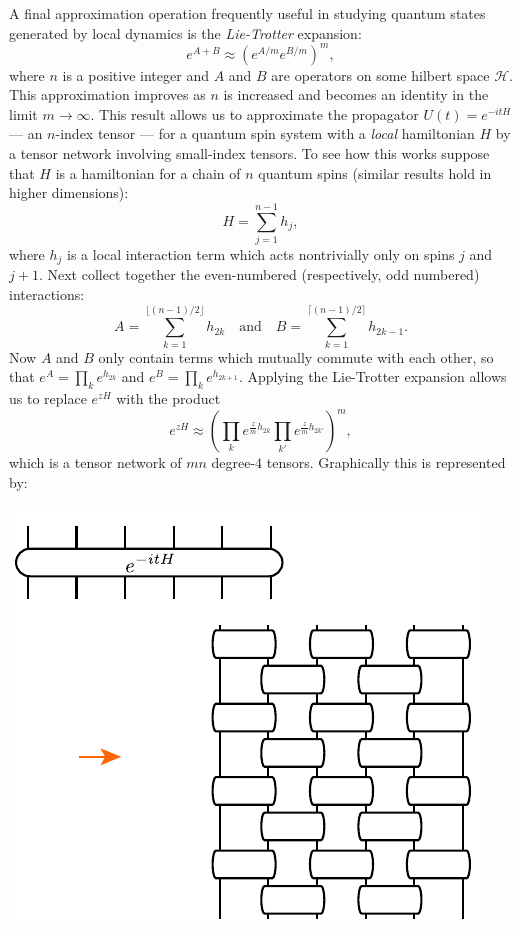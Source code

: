 \documentclass[prl,twocolumn,lengthcheck,superscriptaddress]{revtex4-1}
\theoremstyle{definition}
\theoremstyle{remark}
\begin{document}
A final approximation operation frequently useful in studying quantum states generated by local dynamics is the \emph{Lie-Trotter} expansion:
\begin{equation}
	e^{A+B} \approx (e^{A/m}e^{B/m})^m,
\end{equation}
where $n$ is a positive integer and $A$ and $B$ are operators on some hilbert space $\mathcal{H}$. This approximation improves as $n$ is increased and becomes an identity in the limit $m\rightarrow \infty$. This result allows us to approximate the propagator $U(t) = e^{-itH}$ --- an $n$-index tensor --- for a quantum spin system with a \emph{local} hamiltonian $H$ by a tensor network involving small-index tensors. To see how this works suppose that $H$ is a hamiltonian for a chain of $n$ quantum spins (similar results hold in higher dimensions):
\begin{equation}
	H = \sum_{j=1}^{n-1} h_j,
\end{equation}
where $h_{j}$ is a local interaction term which acts nontrivially only on spins $j$ and $j+1$. Next collect together the even-numbered (respectively, odd numbered) interactions:
\begin{equation}
	A = \sum_{k=1}^{\lfloor (n-1)/2 \rfloor} h_{2k} \quad \text{and} \quad B = \sum_{k=1}^{\lceil (n-1)/2 \rceil} h_{2k-1}.
\end{equation} 
Now $A$ and $B$ only contain terms which mutually commute with each other, so that $e^{A} = \prod_{k} e^{h_{2k}}$ and $e^{B} = \prod_{k} e^{h_{2k+1}}$. Applying the Lie-Trotter expansion allows us to replace $e^{zH}$ with the product
\begin{equation}
	e^{zH} \approx \left(\prod_{k} e^{\frac{z}{m}h_{2k}}\prod_{k'} e^{\frac{z}{m}h_{2k'}}\right)^m,
\end{equation}
which is a tensor network of $mn$ degree-$4$ tensors. Graphically this is represented by: 
\begin{center}
\includegraphics{lietrotter.pdf}
\end{center}
\end{document}
